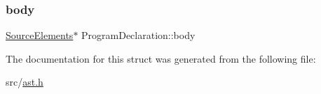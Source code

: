 \subsubsection{\texorpdfstring{body}{body}}
{\footnotesize\ttfamily \hyperlink{struct_source_elements}{Source\+Elements}$\ast$ Program\+Declaration\+::body}



The documentation for this struct was generated from the following file\+:\begin{DoxyCompactItemize}
\item 
src/\hyperlink{ast_8h}{ast.\+h}\end{DoxyCompactItemize}
